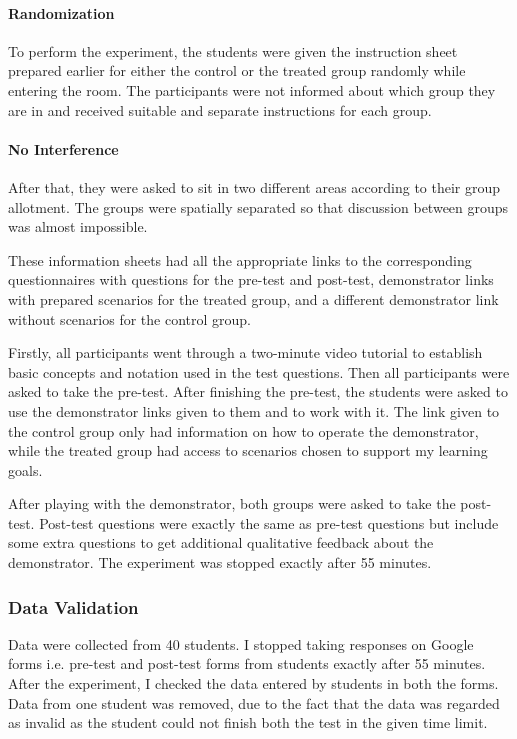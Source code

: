 \paragraph{Randomization} To perform the experiment, the students were given the instruction sheet prepared earlier for either the control or the treated group randomly while entering the room. The participants were not informed about which group they are in and received suitable and separate instructions for each group.

\paragraph{No Interference} After that, they were asked to sit in two different areas according to their group allotment. The groups were spatially separated so that discussion between groups was almost impossible.

These information sheets had all the appropriate links to the corresponding questionnaires with questions for the pre-test and post-test, demonstrator links with prepared scenarios for the treated group, and a different demonstrator link without scenarios for the control group.

Firstly, all participants went through a two-minute video tutorial to establish basic concepts and notation used in the test questions. Then all participants were asked to take the pre-test. After finishing the pre-test, the students were asked to use the demonstrator links given to them and to work with it. The link given to the control group only had information on how to operate the demonstrator, while the treated group had access to scenarios chosen to support my learning goals. 

After playing with the demonstrator, both groups were asked to take the post-test. Post-test questions were exactly the same as pre-test questions but include some extra questions to get additional qualitative feedback about the demonstrator. The experiment was stopped exactly after 55 minutes.

\subsubsection{Data Validation}\label{subsubsec:datavalidation}
Data were collected from 40 students. I stopped taking responses on Google forms i.e. pre-test and post-test forms from students exactly after 55 minutes. After the experiment, I checked the data entered by students in both the forms. Data from one student was removed, due to the fact that the data was regarded as invalid as the student could not finish both the test in the given time limit.

